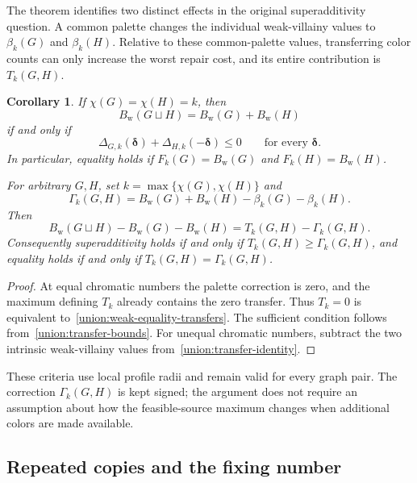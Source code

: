 \documentclass[10pt,a4paper]{amsart}
\numberwithin{equation}{section}
\newtheorem{corollary}[theorem]{Corollary}
\theoremstyle{definition}
\theoremstyle{remark}
\begin{document}
The theorem identifies two distinct effects in the original
superadditivity question.  A common palette changes the individual
weak-villainy values to $\beta_k(G)$ and $\beta_k(H)$.  Relative to
these common-palette values, transferring color counts can only
increase the worst repair cost, and its entire contribution is
$T_k(G,H)$.

\begin{corollary}\label{union:weak-equality-general}
If $\chi(G)=\chi(H)=k$, then
\[
 B_{\mathrm w}(G\sqcup H)=B_{\mathrm w}(G)+B_{\mathrm w}(H)
\]
if and only if
\begin{equation}\label{union:weak-equality-transfers}
 \Delta_{G,k}(\boldsymbol\delta)
 +\Delta_{H,k}(-\boldsymbol\delta)\le0
 \qquad\text{for every }\boldsymbol\delta.
\end{equation}
In particular, equality holds if
$F_k(G)=B_{\mathrm w}(G)$ and $F_k(H)=B_{\mathrm w}(H)$.

For arbitrary $G,H$, set $k=\max\{\chi(G),\chi(H)\}$ and
\[
 \Gamma_k(G,H)=B_{\mathrm w}(G)+B_{\mathrm w}(H)
                   -\beta_k(G)-\beta_k(H).
\]
Then
\begin{equation}\label{union:weak-defect-general}
 B_{\mathrm w}(G\sqcup H)-B_{\mathrm w}(G)-B_{\mathrm w}(H)
 =T_k(G,H)-\Gamma_k(G,H).
\end{equation}
Consequently superadditivity holds if and only if
$T_k(G,H)\ge\Gamma_k(G,H)$, and equality holds if and only if
$T_k(G,H)=\Gamma_k(G,H)$.
\end{corollary}

\begin{proof}
At equal chromatic numbers the palette correction is zero, and the
maximum defining $T_k$ already contains the zero transfer.  Thus
$T_k=0$ is equivalent to~\eqref{union:weak-equality-transfers}.
The sufficient condition follows from~\eqref{union:transfer-bounds}.
For unequal chromatic numbers, subtract the two intrinsic weak-villainy
values from~\eqref{union:transfer-identity}.
\end{proof}

These criteria use local profile radii and remain valid for every
graph pair.  The correction $\Gamma_k(G,H)$ is kept signed; the
argument does not require an assumption about how the feasible-source
maximum changes when additional colors are made available.

\subsection{Repeated copies and the fixing number}
\label{union:repeated-copies}
\end{document}
